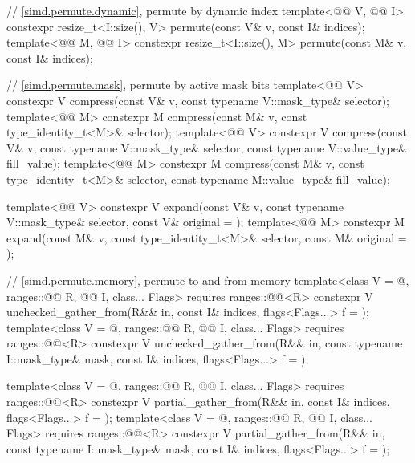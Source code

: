 \begin{codeblock}
{  // \ref{simd.permute.dynamic}, permute by dynamic index
  template<@@ V, @@ I>
    constexpr resize_t<I::size(), V> permute(const V& v, const I& indices);
  template<@@ M, @@ I>
    constexpr resize_t<I::size(), M> permute(const M& v, const I& indices);

  // \ref{simd.permute.mask}, permute by active mask bits
  template<@@ V>
    constexpr V compress(const V& v, const typename V::mask_type& selector);
  template<@@ M>
    constexpr M compress(const M& v, const type_identity_t<M>& selector);
  template<@@ V>
    constexpr V compress(const V& v, const typename V::mask_type& selector,
                         const typename V::value_type& fill_value);
  template<@@ M>
    constexpr M compress(const M& v, const type_identity_t<M>& selector,
                         const typename M::value_type& fill_value);

  template<@@ V>
    constexpr V expand(const V& v, const typename V::mask_type& selector,
                       const V& original = {});
  template<@@ M>
    constexpr M expand(const M& v, const type_identity_t<M>& selector,
                       const M& original = {});

  // \ref{simd.permute.memory}, permute to and from memory
  template<class V = @\seebelow@, ranges::@@ R, @@ I, class... Flags>
    requires ranges::@@<R>
    constexpr V unchecked_gather_from(R&& in, const I& indices, flags<Flags...> f = {});
  template<class V = @\seebelow@, ranges::@@ R, @@ I, class... Flags>
    requires ranges::@@<R>
    constexpr V unchecked_gather_from(R&& in, const typename I::mask_type& mask,
                                      const I& indices, flags<Flags...> f = {});

  template<class V = @\seebelow@, ranges::@@ R, @@ I, class... Flags>
    requires ranges::@@<R>
    constexpr V partial_gather_from(R&& in, const I& indices, flags<Flags...> f = {});
  template<class V = @\seebelow@, ranges::@@ R, @@ I, class... Flags>
    requires ranges::@@<R>
    constexpr V partial_gather_from(R&& in, const typename I::mask_type& mask,
                                    const I& indices, flags<Flags...> f = {});

}
\end{codeblock}
